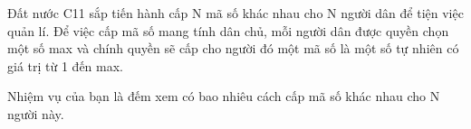 Đất nước C11 sắp tiến hành cấp N mã số khác nhau cho N người dân để tiện việc quản lí. Để việc cấp mã số mang tính dân chủ, mỗi người dân được quyền chọn một số max và chính quyền sẽ cấp cho người đó một mã số là một số tự nhiên có giá trị từ 1 đến max.  

   Nhiệm vụ của bạn là đếm xem có bao nhiêu cách cấp mã số khác nhau cho N người này.